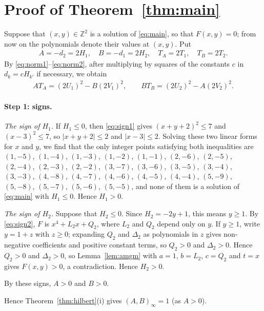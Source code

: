 \documentclass[11pt]{article}
\newcommand{\Z}{\mathbb{Z}}
\begin{document}
\section{Proof of Theorem~\ref{thm:main}}

Suppose that $(x,y)\in\Z^2$ is a solution of \eqref{eq:main}, so that $F(x,y)=0$; from now on the polynomials denote their values at $(x,y)$. Put
\begin{gather*}
A=-d_{2}=2H_{1},\quad B=-d_{1}=2H_{2},\quad T_A=2T_{1},\quad T_B=2T_{2}.
\end{gather*}
By \eqref{eq:norm1}--\eqref{eq:norm2}, after multiplying by squares of the constants $c$ in $d_k=cH_{k'}$ if necessary, we obtain
\begin{align}
AT_A=(2U_{1})^2-B(2V_{1})^2,\qquad BT_B=(2U_{2})^2-A(2V_{2})^2.\label{eq:AB}
\end{align}

\paragraph{Step 1: signs.} \emph{The sign of $H_{1}$.} If $H_{1}\leq0$, then \eqref{eq:sign1} gives $(x+y+2)^2\leq 7$ and $(x-3)^2\leq 7$, so $|x+y+2|\leq2$ and $|x-3|\leq2$. Solving these two linear forms for $x$ and $y$, we find that the only integer points satisfying both inequalities are $(1,-5)$, $(1,-4)$, $(1,-3)$, $(1,-2)$, $(1,-1)$, $(2,-6)$, $(2,-5)$, $(2,-4)$, $(2,-3)$, $(2,-2)$, $(3,-7)$, $(3,-6)$, $(3,-5)$, $(3,-4)$, $(3,-3)$, $(4,-8)$, $(4,-7)$, $(4,-6)$, $(4,-5)$, $(4,-4)$, $(5,-9)$, $(5,-8)$, $(5,-7)$, $(5,-6)$, $(5,-5)$, and none of them is a solution of \eqref{eq:main} with $H_{1}\leq0$. Hence $H_{1}>0$.

\emph{The sign of $H_{2}$.} Suppose that $H_{2}\leq0$. Since $H_{2}=-2y+1$, this means $y\geq1$. By \eqref{eq:sign2}, $F$ is $x^4+L_{2}x+Q_{2}$, where $L_{2}$ and $Q_{2}$ depend only on $y$. If $y\geq1$, write $y=1+z$ with $z\geq0$; expanding $Q_{2}$ and $\Delta_{2}$ as polynomials in $z$ gives non-negative coefficients and positive constant terms, so $Q_{2}>0$ and $\Delta_{2}>0$. Hence $Q_{2}>0$ and $\Delta_{2}>0$, so Lemma~\ref{lem:amgm} with $a=1$, $b=L_{2}$, $c=Q_{2}$ and $t=x$ gives $F(x,y)>0$, a contradiction. Hence $H_{2}>0$.

By these signs, $A>0$ and $B>0$.

Hence Theorem~\ref{thm:hilbert}(i) gives $(A,B)_\infty=1$ (as $A>0$).
\end{document}
